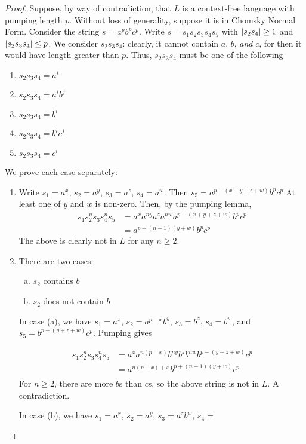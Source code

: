 \begin{proof}
    Suppose, by way of contradiction, that \(L\) is a context-free language with pumping length \(p\). Without loss of generality, suppose it is in Chomsky Normal Form. Consider the string \(s=a^p b^p c^p\). Write \(s=s_1 s_2 s_3 s_4 s_5\) with \(\abs{s_2 s_4}\geq 1\) and \(\abs{s_2 s_3 s_4}\leq p\). We consider \(s_2 s_3 s_4\): clearly, it cannot contain \(a\), \(b\), \textit{and} \(c\), for then it would have length greater than \(p\). Thus, \(s_2 s_3 s_4\) must be one of the following
    
    \begin{enumerate}[1.]
        \item \(s_2 s_3 s_4 = a^i\)
        \item \(s_2 s_3 s_4 = a^i b^j\)
        \item \(s_2 s_3 s_4 = b^i\)
        \item \(s_2 s_3 s_4 = b^i c^j\)
        \item \(s_2 s_3 s_4 = c^i\)
    \end{enumerate}

    We prove each case separately:

    \begin{enumerate}[1.]
        \item Write \(s_1=a^x\), \(s_2=a^y\), \(s_3=a^z\), \(s_4=a^w\). Then \(s_5=a^{p-(x+y+z+w)}b^p c^p\) At least one of \(y\) and \(w\) is non-zero. Then, by the pumping lemma, 
            \begin{align*} 
                s_1 s_2^n s_3 s_4^n s_5 &= a^x a^{ny} a^z a^{nw} a^{p-(x+y+z+w)}b^p c^p\\
                                        &= a^{p+(n-1)(y+w)}b^p c^p
            \end{align*}
            The above is clearly not in \(L\) for any \(n\geq 2\).
        \item There are two cases: 
            \begin{enumerate}[(a)]
                \item \(s_2\) contains \(b\)
                \item \(s_2\) does not contain \(b\)
            \end{enumerate}

            In case (a), we have \(s_1=a^x\), \(s_2=a^{p-x}b^y\), \(s_3=b^z\), \(s_4=b^w\), and \(s_5=b^{p-(y+z+w)}c^p\). Pumping gives 

            \begin{align*}
                s_1 s_2^n s_3 s_4^n s_5 &= a^x a^{n(p-x)} b^{ny} b^z b^{nw}b^{p-(y+z+w)}c^p \\
                                        &= a^{n(p-x)+x} b^{p+(n-1)(y+w)} c^p\\
            \end{align*}
            For \(n\geq 2\), there are more \(b\)s than \(c\)s, so the above string is not in \(L\). A contradiction.
            
            In case (b), we have \(s_1=a^x\), \(s_2=a^y\), \(s_3=a^z b^w\), \(s_4=\)
    \end{enumerate}
\end{proof}